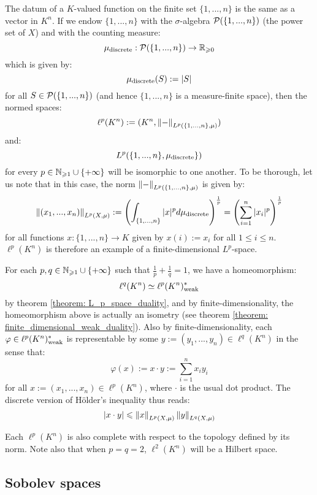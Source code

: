         \begin{example}
            The datum of a $K$-valued function on the finite set $\{1, ..., n\}$ is the same as a vector in $K^n$. If we endow $\{1, ..., n\}$ with the $\sigma$-algebra $\mathcal{P}(\{1, ..., n\})$ (the power set of $X$) and with the counting measure:
                $$\mu_{\mathrm{discrete}}: \mathcal{P}(\{1, ..., n\}) \to \mathbb{R}_{\geqslant 0}$$
            which is given by:
                $$\mu_{\mathrm{discrete}}(S) := |S|$$
            for all $S \in \mathcal{P}(\{1, ..., n\})$ (and hence $\{1, ..., n\}$ is a measure-finite space), then the normed spaces:
                $$\ell^p(K^n) := (K^n, \left\| {-} \right\|_{L^p(\{1, ..., n\}, \mu)})$$
            and:
                $$L^p(\{1, ..., n\}, \mu_{\mathrm{discrete}}\})$$
            for every $p \in \mathbb{N}_{\geqslant 1} \cup \{+\infty\}$ will be isomorphic to one another. To be thorough, let us note that in this case, the norm $\left\| {-} \right\|_{L^p(\{1, ..., n\}, \mu)}$ is given by:
                $$\left\| {(x_1, ..., x_n)} \right\|_{L^p(X, \mu)} := \left( \int_{\{1, ..., n\}} |x|^p d\mu_{\mathrm{discrete}} \right)^{\frac1p} = \left( \sum_{i = 1}^n |x_i|^p \right)^{\frac1p}$$
            for all functions $x: \{1, ..., n\} \to K$ given by $x(i) := x_i$ for all $1 \leq i \leq n$. $\ell^p(K^n)$ is therefore an example of a finite-dimensional $L^p$-space.

            For each $p, q \in \mathbb{N}_{\geqslant 1} \cup \{+\infty\}$ such that $\frac1p + \frac1q = 1$, we have a homeomorphism:
                $$\ell^q(K^n) \simeq \ell^p(K^n)^*_{\mathrm{weak}}$$
            by theorem \ref{theorem: L_p_space_duality}, and by finite-dimensionality, the homeomorphism above is actually an isometry (see theorem \ref{theorem: finite_dimensional_weak_duality}). Also by finite-dimensionality, each $\varphi \in \ell^p(K^n)^*_{\mathrm{weak}}$ is representable by some $y := (y_1, ..., y_n) \in \ell^q(K^n)$ in the sense that:
                $$\varphi(x) := x \cdot y := \sum_{i = 1}^n x_i y_i$$
            for all $x := (x_1, ..., x_n) \in \ell^p(K^n)$, where $\cdot$ is the usual dot product. The discrete version of H\"older's inequality thus reads:
                $$\left\lvert {x \cdot y} \right\rvert \leqslant \left\| {x} \right\|_{L^p(X, \mu)} \left\| {y} \right\|_{L^q(X, \mu)}$$

            Each $\ell^p(K^n)$ is also complete with respect to the topology defined by its norm. Note also that when $p = q = 2$, $\ell^2(K^n)$ will be a Hilbert space.
        \end{example}

    \subsection{Sobolev spaces}